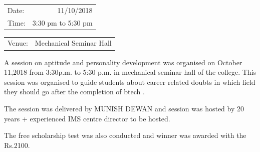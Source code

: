 \documentclass[12pt, a4 paper]{article}
\begin{document}
\begin{center}
\begin{multicols}{2}
\begin{tabular}{l r}
Date: & 11/10/2018\\ %
Time: & 3:30 pm to 5:30 pm \\ %
\end{tabular}
\columnbreak
\begin{tabular}{l r}
Venue: & Mechanical Seminar Hall  \\ %
\end{tabular}
\end{multicols}

\begin{Large}
\begin{multicols}{2}
A session on aptitude and personality development was organised on October 11,2018 from 3:30p.m. to 5:30 p.m. in mechanical seminar hall of the college. This session was organised to guide students about career related doubts in which field they should go after the completion of btech .

\columnbreak
\end{multicols}

\begin{multicols}{2}


\columnbreak
The session was delivered by MUNISH DEWAN and session was hosted by 20 years + experienced IMS centre director to be hosted.

\end{multicols}

\newpage 


\begin{multicols}{2}
The free scholarship test was also conducted and winner was awarded with the Rs.2100.

\columnbreak
  
\end{multicols}


\end{Large}
\end{center}
\end{document}

